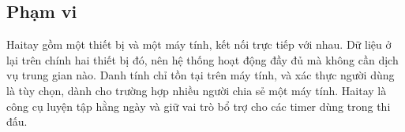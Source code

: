 \subsection{Phạm vi}
Haitay gồm một thiết bị và một máy tính, kết nối trực tiếp với nhau. Dữ liệu ở lại trên chính hai thiết bị đó, nên hệ thống hoạt động đầy đủ mà không cần dịch vụ trung gian nào. Danh tính chỉ tồn tại trên máy tính, và xác thực người dùng là tùy chọn, dành cho trường hợp nhiều người chia sẻ một máy tính. Haitay là công cụ luyện tập hằng ngày và giữ vai trò bổ trợ cho các timer dùng trong thi đấu.
